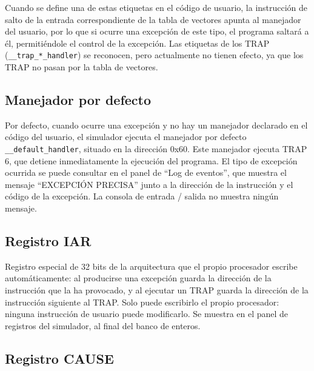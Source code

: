\documentclass[../main.tex]{subfiles}
\begin{document}
Cuando se define una de estas etiquetas en el código de usuario, la instrucción de salto de la entrada correspondiente de la tabla de vectores apunta al manejador del usuario, por lo que si ocurre una excepción de este tipo, el programa saltará a él, permitiéndole el control de la excepción. Las etiquetas de los TRAP (\texttt{\_\_trap\_*\_handler}) se reconocen, pero actualmente no tienen efecto, ya que los TRAP no pasan por la tabla de vectores.

\subsection{Manejador por defecto}

Por defecto, cuando ocurre una excepción y no hay un manejador declarado en el código del usuario, el simulador ejecuta el manejador por defecto \texttt{\_\_default\_handler}, situado en la dirección 0x60. Este manejador ejecuta TRAP 6, que detiene inmediatamente la ejecución del programa. El tipo de excepción ocurrida se puede consultar en el panel de ``Log de eventos'', que muestra el mensaje ``EXCEPCIÓN PRECISA'' junto a la dirección de la instrucción y el código de la excepción. La consola de entrada / salida no muestra ningún mensaje.

\subsection{Registro IAR}

Registro especial de 32 bits de la arquitectura que el propio procesador escribe automáticamente: al producirse una excepción guarda la dirección de la instrucción que la ha provocado, y al ejecutar un TRAP guarda la dirección de la instrucción siguiente al TRAP. Solo puede escribirlo el propio procesador: ninguna instrucción de usuario puede modificarlo. Se muestra en el panel de registros del simulador, al final del banco de enteros.

\subsection{Registro CAUSE}
\end{document}
